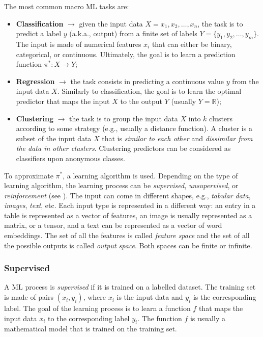 The most common macro \gls{ML} tasks are:
%
\begin{itemize}
    \item \textbf{Classification} $\rightarrow$ given the input data $X={x_1, x_2, \dots, x_n}$, the task is to predict a label $y$ (a.k.a., output) from a finite set of labels $Y=\{y_1, y_2, \dots, y_m\}$.
    The input is made of numerical features $x_i$ that can either be binary, categorical, or continuous.
    Ultimately, the goal is to learn a prediction function $\pi^{*}: X \rightarrow Y$;
    \item \textbf{Regression} $\rightarrow$ the task consists in predicting a continuous value $y$ from the input data $X$.
    Similarly to classification, the goal is to learn the optimal predictor that maps the input $X$ to the output $Y$ (usually $Y=\mathbb{R}$);
    \item \textbf{Clustering} $\rightarrow$ the task is to group the input data $X$ into $k$ clusters according to some strategy (e.g., usually a distance function).
    A cluster is a subset of the input data $X$ that is \emph{similar to each other} and \emph{dissimilar from the data in other clusters}.
    Clustering predictors can be considered as classifiers upon anonymous classes.
\end{itemize}
%
To approximate $\pi^{*}$, a learning algorithm is used.
%
Depending on the type of learning algorithm, the learning process can be \emph{supervised}, \emph{unsupervised}, or \emph{reinforcement} (see ).
%
The input can come in different shapes, e.g., \emph{tabular data}, \emph{images}, \emph{text}, etc.
%
Each input type is represented in a different way: an entry in a table is represented as a vector of features, an image is usually represented as a matrix, or a tensor, and a text can be represented as a vector of word embeddings.
%
The set of all the features is called \emph{feature space} and the set of all the possible outputs is called \emph{output space}.
%
Both spaces can be finite or infinite.
%


\subsubsection{Supervised}\label{subsubsec:supervised}
%
A \gls{ML} process is \emph{supervised} if it is trained on a labelled dataset.
%
The training set is made of pairs $(x_i, y_i)$, where $x_i$ is the input data and $y_i$ is the corresponding label.
%
The goal of the learning process is to learn a function $f$ that maps the input data $x_i$ to the corresponding label $y_i$.
%
The function $f$ is usually a mathematical model that is trained on the training set.
%


